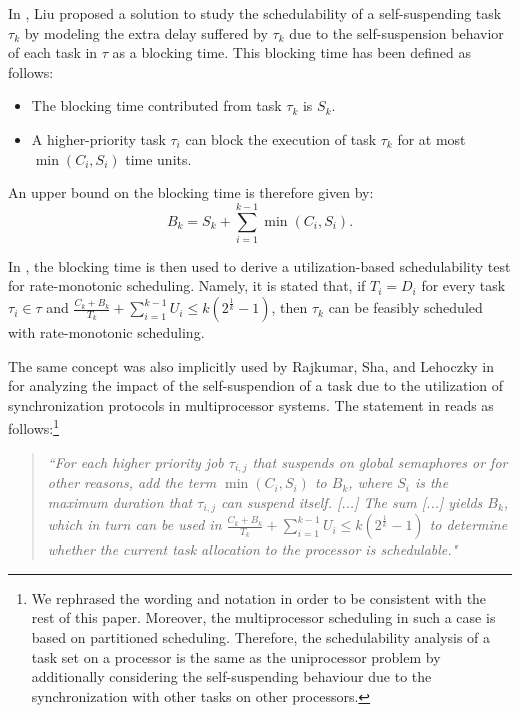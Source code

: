 In \cite[p. 164-165]{Liu:2000:RS:518501}, Liu proposed a solution to study the schedulability of a self-suspending task $\tau_k$ by modeling the extra delay suffered by $\tau_k$ due to the self-suspension behavior of each task in $\tau$ as a blocking time. This blocking time has been defined as follows:
\begin{itemize}
\item The blocking time contributed from task $\tau_k$ is $S_k$. 
\item A higher-priority task $\tau_i$ can block the execution of task $\tau_k$ for at most $\min(C_i, S_i)$ time units.
\end{itemize}
An upper bound on the blocking time is therefore given by:
\begin{equation}
\label{eq:Bk}
B_k = S_k + \sum_{i=1}^{k-1} \min(C_i, S_i).
\end{equation}

In \cite{Liu:2000:RS:518501}, the blocking time is then used to derive a utilization-based schedulability test for rate-monotonic scheduling. Namely, it is stated that, if $T_i=D_i$ for every task $\tau_i \in \tau$ and $\frac{C_k+B_k}{T_k} + \sum_{i=1}^{k-1} U_i \leq k (2^{\frac{1}{k}}-1)$, then $\tau_k$ can be feasibly scheduled with rate-monotonic scheduling. 
  

The same concept was also implicitly used by Rajkumar, Sha, and Lehoczky in~\cite[p. 267]{DBLP:conf/rtss/RajkumarSL88} for analyzing the impact of the self-suspendion of a task due to the utilization of synchronization protocols in multiprocessor systems. The statement in \cite{DBLP:conf/rtss/RajkumarSL88} reads as follows:\footnote{We rephrased the wording and notation in order to be consistent with the rest of this paper. Moreover, the multiprocessor scheduling in such a case is based on partitioned scheduling. Therefore, the schedulability analysis of a task set on a processor is the same as the uniprocessor problem by additionally considering the self-suspending behaviour due to the synchronization with other tasks on other processors.}
\begin{quote}
\emph{``For each higher priority job $\tau_{i,j}$ that suspends on global semaphores or for other reasons, add the term $\min(C_i, S_i)$ to $B_k$, where $S_i$ is the maximum duration that $\tau_{i,j}$ can suspend itself. [...] The sum [...] yields $B_k$, which in turn can be used in 
$\frac{C_k+B_k}{T_k} + \sum_{i=1}^{k-1} U_i \leq k (2^{\frac{1}{k}}-1)$ to determine whether the current task allocation to the processor is schedulable."}
\end{quote}
  
